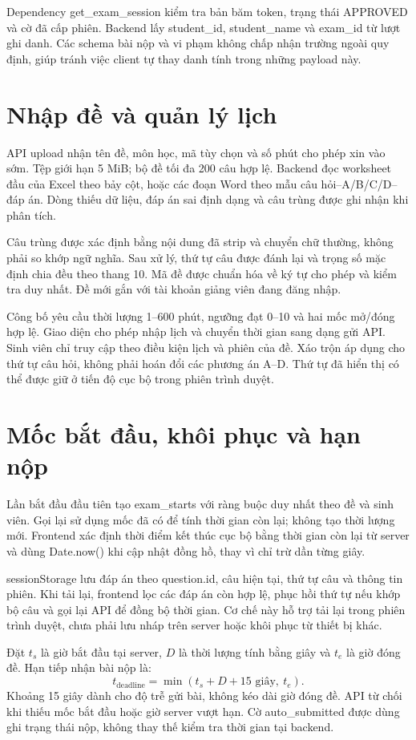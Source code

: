 Dependency get\_exam\_session kiểm tra bản băm token, trạng thái APPROVED và cờ đã cấp phiên. Backend lấy student\_id, student\_name và exam\_id từ lượt ghi danh. Các schema bài nộp và vi phạm không chấp nhận trường ngoài quy định, giúp tránh việc client tự thay danh tính trong những payload này.

\section{Nhập đề và quản lý lịch}
API upload nhận tên đề, môn học, mã tùy chọn và số phút cho phép xin vào sớm. Tệp giới hạn 5 MiB; bộ đề tối đa 200 câu hợp lệ. Backend đọc worksheet đầu của Excel theo bảy cột, hoặc các đoạn Word theo mẫu câu hỏi--A/B/C/D--đáp án. Dòng thiếu dữ liệu, đáp án sai định dạng và câu trùng được ghi nhận khi phân tích.

Câu trùng được xác định bằng nội dung đã strip và chuyển chữ thường, không phải so khớp ngữ nghĩa. Sau xử lý, thứ tự câu được đánh lại và trọng số mặc định chia đều theo thang 10. Mã đề được chuẩn hóa về ký tự cho phép và kiểm tra duy nhất. Đề mới gắn với tài khoản giảng viên đang đăng nhập.

Công bố yêu cầu thời lượng 1--600 phút, ngưỡng đạt 0--10 và hai mốc mở/đóng hợp lệ. Giao diện cho phép nhập lịch và chuyển thời gian sang dạng gửi API. Sinh viên chỉ truy cập theo điều kiện lịch và phiên của đề. Xáo trộn áp dụng cho thứ tự câu hỏi, không phải hoán đổi các phương án A--D. Thứ tự đã hiển thị có thể được giữ ở tiến độ cục bộ trong phiên trình duyệt.

\section{Mốc bắt đầu, khôi phục và hạn nộp}
Lần bắt đầu đầu tiên tạo exam\_starts với ràng buộc duy nhất theo đề và sinh viên. Gọi lại sử dụng mốc đã có để tính thời gian còn lại; không tạo thời lượng mới. Frontend xác định thời điểm kết thúc cục bộ bằng thời gian còn lại từ server và dùng Date.now() khi cập nhật đồng hồ, thay vì chỉ trừ dần từng giây.

sessionStorage lưu đáp án theo question.id, câu hiện tại, thứ tự câu và thông tin phiên. Khi tải lại, frontend lọc các đáp án còn hợp lệ, phục hồi thứ tự nếu khớp bộ câu và gọi lại API để đồng bộ thời gian. Cơ chế này hỗ trợ tải lại trong phiên trình duyệt, chưa phải lưu nháp trên server hoặc khôi phục từ thiết bị khác.

Đặt $t_s$ là giờ bắt đầu tại server, $D$ là thời lượng tính bằng giây và $t_e$ là giờ đóng đề. Hạn tiếp nhận bài nộp là:
\begin{equation}
 t_{\mathrm{deadline}}=\min(t_s+D+15\text{ giây},\ t_e).
\end{equation}
Khoảng 15 giây dành cho độ trễ gửi bài, không kéo dài giờ đóng đề. API từ chối khi thiếu mốc bắt đầu hoặc giờ server vượt hạn. Cờ auto\_submitted được dùng ghi trạng thái nộp, không thay thế kiểm tra thời gian tại backend.

